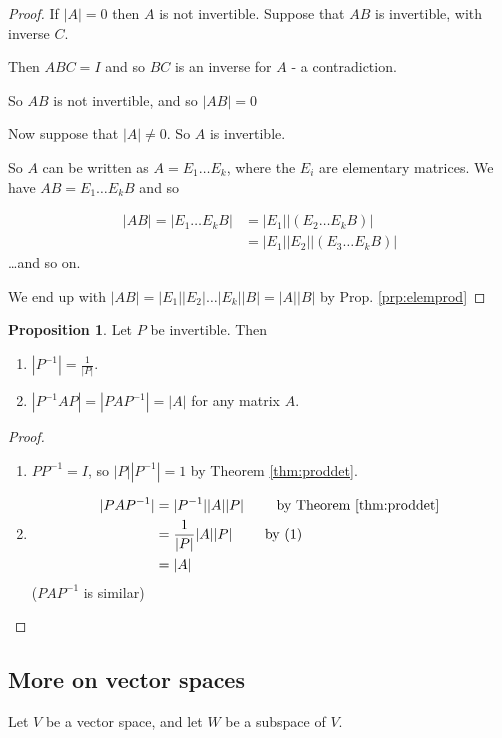 \documentclass{article}
\theoremstyle{definition} \newtheorem*{definition}{Definition}
\newtheorem{proposition}[theorem]{Proposition}
\newcommand{\Det}[1]{|#1|}
\begin{document}
  \begin{proof}
    If $\Det{A}=0$ then $A$ is not invertible. Suppose that $AB$ is
    invertible, with inverse $C$. 

    Then $ABC=I$ and so $BC$ is an inverse for $A$ - a contradiction.

    So $AB$ is not invertible, and so $\Det{AB}=0$

    Now suppose that $\Det{A}\neq 0$. So $A$ is invertible.

    So $A$ can be written as $A = E_1 \dots E_k$, where the $E_i$
    are elementary matrices. We have $AB = E_1 \dots E_k B$ and so

\begin{align*}
  |AB| = |E_1 \dots E_k B| &= |E_1| |\left( E_2 \dots E_k B\right)| \\
  &= |E_1||E_2||\left( E_3 \dots E_k B \right)|
\end{align*} \dots and so on.

We end up with $|AB| = |E_1||E_2| \dots |E_k| |B| = |A||B|$ by Prop. \ref{prp:elemprod}
  \end{proof}


  \begin{proposition}
    Let $P$ be invertible. Then 
    \begin{enumerate}
      \item $|P^{-1}| = \frac{1}{|P|}$.
      \item $|P^{-1}AP| = |PAP^{-1}| = |A|$ for any matrix $A$.
    \end{enumerate}
    \label{prp:pap}
  \end{proposition}

  \begin{proof}\hfill
    \begin{enumerate}
      \item $PP^{-1} = I$, so $|P||P^{-1}| = 1$ by Theorem \ref{thm:proddet}.
      \item 
        \begin{align*}
          |PAP^{-1}| &= |P^{-1}||A||P| 
          \qquad \text{ by Theorem \ref{thm:proddet} }\\
          &= \frac{1}{|P|}|A||P| \qquad\text{ by } (1)\\
          &= |A|
        \end{align*} ($PAP^{-1}$ is similar)
    \end{enumerate}
  \end{proof}


  \subsection*{More on vector spaces}
  Let $V$ be a vector space, and let $W$ be a subspace of $V$.
\end{document}
